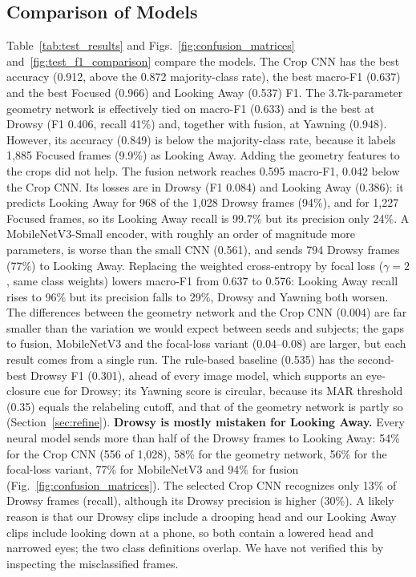 \documentclass[conference]{IEEEtran}
\begin{document}
\subsection{Comparison of Models}\label{sec:compare}
Table~\ref{tab:test_results} and Figs.~\ref{fig:confusion_matrices} and~\ref{fig:test_f1_comparison} compare the models. The Crop CNN has the best accuracy (0.912, above the 0.872 majority-class rate), the best macro-F1 (0.637) and the best Focused (0.966) and Looking Away (0.537) F1. The 3.7k-parameter geometry network is effectively tied on macro-F1 (0.633) and is the best at Drowsy (F1 0.406, recall 41\%) and, together with fusion, at Yawning (0.948). However, its accuracy (0.849) is below the majority-class rate, because it labels 1,885 Focused frames (9.9\%) as Looking Away.
Adding the geometry features to the crops did not help. The fusion network reaches 0.595 macro-F1, 0.042 below the Crop CNN. Its losses are in Drowsy (F1 0.084) and Looking Away (0.386): it predicts Looking Away for 968 of the 1,028 Drowsy frames (94\%), and for 1,227 Focused frames, so its Looking Away recall is 99.7\% but its precision only 24\%. A MobileNetV3-Small encoder, with roughly an order of magnitude more parameters, is worse than the small CNN (0.561), and sends 794 Drowsy frames (77\%) to Looking Away. Replacing the weighted cross-entropy by focal loss (\(\gamma = 2\), same class weights) lowers macro-F1 from 0.637 to 0.576: Looking Away recall rises to 96\% but its precision falls to 29\%, Drowsy and Yawning both worsen. The differences between the geometry network and the Crop CNN (0.004) are far smaller than the variation we would expect between seeds and subjects; the gaps to fusion, MobileNetV3 and the focal-loss variant (0.04--0.08) are larger, but each result comes from a single run. The rule-based baseline (0.535) has the second-best Drowsy F1 (0.301), ahead of every image model, which supports an eye-closure cue for Drowsy; its Yawning score is circular, because its MAR threshold (0.35) equals the relabeling cutoff, and that of the geometry network is partly so (Section~\ref{sec:refine}).
\newline
\textbf{Drowsy is mostly mistaken for Looking Away.} Every neural model sends more than half of the Drowsy frames to Looking Away: 54\% for the Crop CNN (556 of 1,028), 58\% for the geometry network, 56\% for the focal-loss variant, 77\% for MobileNetV3 and 94\% for fusion (Fig.~\ref{fig:confusion_matrices}). The selected Crop CNN recognizes only 13\% of Drowsy frames (recall), although its Drowsy precision is higher (30\%). A likely reason is that our Drowsy clips include a drooping head and our Looking Away clips include looking down at a phone, so both contain a lowered head and narrowed eyes; the two class definitions overlap. We have not verified this by inspecting the misclassified frames.
\end{document}

